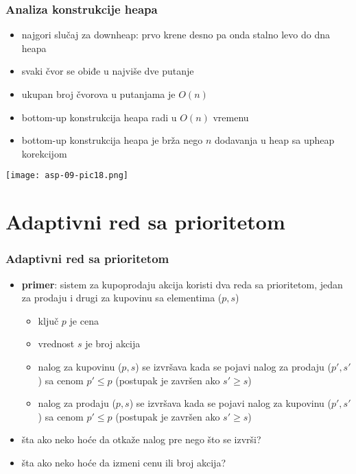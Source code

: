 \documentclass[compress,aspectratio=169]{beamer}
\begin{document}
\begin{frame}[fragile]
  \frametitle{Analiza konstrukcije heapa}
  \begin{itemize}
    \item najgori slučaj za downheap: prvo krene desno pa onda stalno levo do
    dna heapa
    \item svaki čvor se obiđe u najviše dve putanje
    \item ukupan broj čvorova u putanjama je $O(n)$
    \item bottom-up konstrukcija heapa radi u $O(n)$ vremenu
    \item bottom-up konstrukcija heapa je brža nego $n$ dodavanja u heap sa upheap korekcijom
  \end{itemize}
  \begin{center}
    \texttt{[image: asp-09-pic18.png]}
  \end{center}
\end{frame}

\section[Adaptivni RSP]{Adaptivni red sa prioritetom}
\begin{frame}[fragile]
  \frametitle{Adaptivni red sa prioritetom}
  \begin{itemize}
    \item \textbf{primer}: sistem za kupoprodaju akcija koristi dva reda sa
    prioritetom, jedan za prodaju i drugi za kupovinu sa elementima ($p, s$)
    \begin{itemize}
      \item ključ $p$ je cena
      \item vrednost $s$ je broj akcija
      \item nalog za kupovinu ($p, s$) se izvršava kada se pojavi nalog za
      prodaju ($p', s'$) sa cenom $p'\leq p$ (postupak je završen ako $s'\geq
      s$)
      \item nalog za prodaju ($p, s$) se izvršava kada se pojavi nalog za
      kupovinu ($p', s'$) sa cenom $p'\leq p$ (postupak je završen ako $s'\geq
      s$)
    \end{itemize}
    \item šta ako neko hoće da otkaže nalog pre nego što se izvrši?
    \item šta ako neko hoće da izmeni cenu ili broj akcija?
  \end{itemize}
\end{frame}
\end{document}
